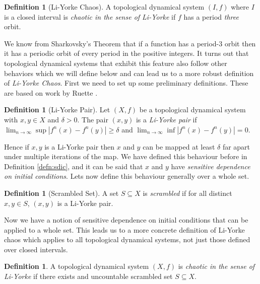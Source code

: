\documentclass[11pt,a4paper,oneside]{memoir}
\theoremstyle{plain}
\theoremstyle{definition}
\newtheorem{defn}[thm]{Definition}
\begin{document}
\begin{defn}[Li-Yorke Chaos] \label{defn:li-yorke-chaos}
    A topological dynamical system $(I, f)$ where $I$ is a closed interval is \emph{chaotic in the sense of Li-Yorke} if $f$ has a period \emph{three} orbit.
\end{defn}

We know from Sharkovsky's Theorem that if a function has a period-3 orbit then it has a periodic orbit of every period in the positive integers. It turns out that topological dynamical systems that exhibit this feature also follow other behaviors which we will define below and can lead us to a more robust definition of \emph{Li-Yorke Chaos}. First we need to set up some preliminary definitions. These are based on work by Ruette \cite[Section 5.1]{ruette}.

\begin{defn}[Li-Yorke Pair] \label{defn:li-yorke-pair}
    Let $(X, f)$ be a topological dynamical system with $x, y \in X$ and $\delta > 0$. The pair $(x, y)$ is a \emph{Li-Yorke pair} if $\lim_{n \to \infty}\sup \left\lvert f^n(x) - f^n(y) \right\rvert \geq \delta$ and $\lim_{n\to\infty}\inf \left\lvert f^n(x) - f^n(y) \right\rvert = 0$.
\end{defn}

Hence if $x, y$ is a Li-Yorke pair then $x$ and $y$ can be mapped at least $\delta$ far apart under multiple iterations of the map. We have defined this behaviour before in Definition \ref{defn:sdic}, and it can be said that $x$ and $y$ have \emph{sensitive dependence on initial conditions}. Lets now define this behaviour generally over a whole set.

\begin{defn} [Scrambled Set] \label{defn:scrambled-set}
    A set $S \subseteq X$ is \emph{scrambled} if for all distinct $x, y \in S$, $(x, y)$ is a Li-Yorke pair.
\end{defn}

Now we have a notion of sensitive dependence on initial conditions that can be applied to a whole set. This leads us to a more concrete definition of Li-Yorke chaos which applies to all topological dynamical systems, not just those defined over closed intervals.

\begin{defn}
    A topological dynamical system $(X, f)$ is \emph{chaotic in the sense of Li-Yorke} if there exists and uncountable scrambled set $S \subseteq X$.
\end{defn}
\end{document}
